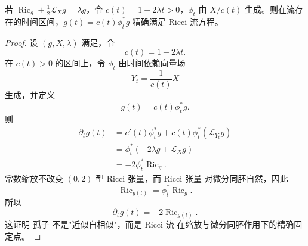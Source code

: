 \begin{proposition}
若 $\operatorname{Ric}_g+\frac12\mathcal L_Xg=\lambda g$，令 $c(t)=1-2\lambda t>0$，$\phi_t$ 由 $X/c(t)$ 生成。则在流存在的时间区间，$g(t)=c(t)\phi_t^*g$ 精确满足 Ricci 流方程。
\end{proposition}

\begin{proof}
设 $(g,X,\lambda)$ 满足，令
\[
c(t)=1-2\lambda t.
\]
在 $c(t)>0$ 的区间上，令 $\phi_t$ 由时间依赖向量场
\[
Y_t=\frac{1}{c(t)}X
\]
生成，并定义
\begin{equation}
g(t)=c(t)\phi_t^*g.
\label{eq:math-dg-soliton-selfsimilar-flow}
\end{equation}
则
\begin{align*}
\partial_tg(t)
&=c'(t)\phi_t^*g
+c(t)\phi_t^*(\mathcal L_{Y_t}g)\\
&=\phi_t^*(-2\lambda g+\mathcal L_Xg)\\
&=-2\phi_t^*\operatorname{Ric}_g.
\end{align*}
常数缩放不改变 $(0,2)$ 型 Ricci 张量，而 Ricci 张量 对微分同胚自然，因此
\[
\operatorname{Ric}_{g(t)}=\phi_t^*\operatorname{Ric}_g.
\]
所以
\[
\partial_tg(t)=-2\operatorname{Ric}_{g(t)}.
\]
这证明 孤子 不是"近似自相似"，而是 Ricci 流 在缩放与微分同胚作用下的精确固定点。
\end{proof}
